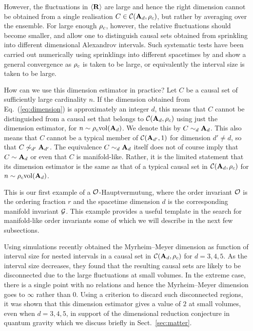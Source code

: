 However, the fluctuations in $\langle {\mathbf R} \rangle$ are
large and hence the right dimension cannot be obtained from  a single realisation $C \in \mathcal C(\mathbf A_d,\rho_c)$, but rather
by  averaging over the ensemble.  
For large enough $\rho_c$, however, the relative
fluctuations should become smaller, and allow one to distinguish causal sets obtained from sprinkling into different
dimensional Alexandrov intervals. Such systematic tests have been carried out numerically using sprinklings into
different spacetimes by \cite{reid} and show a general convergence as $\rho_c$ is taken to be large, or
equivalently the interval size is taken to be large. 


 How can we use this dimension estimator in practice?  Let $C$ be a causal set of sufficiently large cardinality
 $n$. If the dimension obtained from Eq.~(\ref{eq:dimension})  is approximately  an integer $d$, this means that $C$ cannot be distinguished
 from a causal set that  belongs to $\mathcal C(\mathbf A_d,\rho_c)$ using {just} the dimension estimator, for $n \sim \rho_c \mathrm{vol}(\mathbf A_d)$. We denote this by   $C \sim_d
\mathbf A_d$. This also means that $C$ cannot be a typical member of $\mathcal C(\mathbf A_{d'},1)$ for dimension $d'\neq
d$, so that $C \not\sim_{d'} \mathbf A_{d'}$. The equivalence $C\sim_d \mathbf A_d$ itself does not of course imply that   $C \sim \mathbf A_d$ or  even  that $C$ is manifold-like. Rather, it is the limited
statement that its dimension estimator is the same as that of a typical causal set in $ \mathcal C(\mathbf A_d,\rho_c)$ for  $n \sim
\rho_c \mathrm{vol}(\mathbf A_d)$.

This is our first example of a $\mathcal O$-Hauptvermutung, where the order invariant $\mathcal O$ is
the  ordering fraction $r$ and the spacetime  dimension $d$  is the corresponding manifold invariant $\mathcal G$. This example
provides a useful  template in the search for manifold-like order
  invariants some of which we will describe in the next few subsections. 



Using simulations \cite{carlipdrone} recently obtained the Myrheim--Meyer
dimension  as function of interval size for nested intervals in a causal set in $\mathcal C(\mathbf A_d,\rho_c)$ for
$d=3,4,5$. As the interval size decreases, they found that the resulting causal sets are likely to
be disconnected due to the large fluctuations at  small volumes. In the extreme case, there
is a single point with
no relations and hence the Myrheim--Meyer dimension goes to $\infty$ rather than $0$. Using a criterion to discard such
disconnected regions, it was shown that this dimension estimator gives a value of $2$ at small volumes, 
even when $d=3,4,5$, in support of the dimensional reduction conjecture in quantum gravity \citep{carlipdr} which we 
discuss briefly in Sect.~\ref{sec:matter}. 

